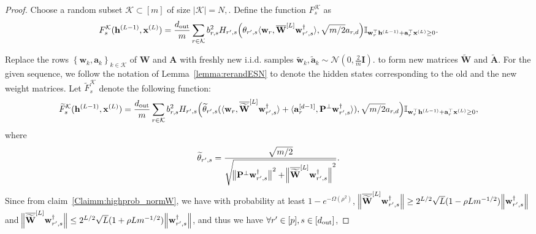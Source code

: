 \begin{claim}
\begin{proof}
				Choose a random subset $\mathcal{K} \subset[m]$ of size $|\mathcal{K}|=N,$. Define the function $F^{\mathcal{K}}_s$ as
				\begin{equation*}
					F_{s}^{\mathcal{K}}(\mathbf{h}^{(L-1)}, \mathbf{x}^{(L)}) = \frac{d_{\mathrm{out}} }{m} \sum_{r \in \mathcal{K}} b_{r, s}^2 H_{r', s}\Big(\theta_{r', s} \langle \mathbf{w}_{r}, \overline{\mathbf{W}}^{[L]} \mathbf{w}_{r', s}^{\dagger}\rangle, \sqrt{m/2} a_{r, d}\Big) \mathbb{I}_{\mathbf{w}_r^{\top} \mathbf{h}^{(L-1)} + \mathbf{a}_r^{\top} \mathbf{x}^{(L)} \ge 0}.  
				\end{equation*}
				
				Replace the rows $\left\{\mathbf{w}_{k}, \mathbf{a}_{k}\right\}_{k \in \mathcal{K}}$ of $\mathbf{W}$ and $\mathbf{A}$ with freshly new i.i.d. samples $\widetilde{\mathbf{w}}_{k}, \widetilde{\mathbf{a}}_{k} \sim \mathcal{N}\left(0, \frac{2}{m} \mathbf{I}\right).$ to form new matrices $\widetilde{\mathbf{W}}$ and $\widetilde{\mathbf{A}}$. For the given sequence, we follow the notation of Lemma~\ref{lemma:rerandESN} to denote the hidden states corresponding to the old and the new weight matrices. Let $\widetilde{F}^{\mathcal{K}}_s$ denote the following function:
				\begin{equation*} \widetilde{F}^{\mathcal{K}}_s(\mathbf{h}^{(L-1)}, \mathbf{x}^{(L)}) = \frac{d_{\mathrm{out}} }{m} \sum_{r \in \mathcal{K}} b_{r, s}^2 H_{r', s}\Big(\widetilde{\theta}_{r', s} (\langle \mathbf{w}_{r}, \overline{\widetilde{\mathbf{W}}}^{[L]} \mathbf{w}_{r', s}^{\dagger}\rangle + \langle \mathbf{a}_{r}^{[d-1]},  \mathbf{P}^{\perp}\mathbf{w}_{r', s}^{\dagger}  \rangle), \sqrt{m/2} a_{r, d}\Big) \mathbb{I}_{\mathbf{w}_r^{\top} \mathbf{h}^{(L-1)} + \mathbf{a}_r^{\top} \mathbf{x}^{(L)} \ge 0},
				\end{equation*}
				where
				\begin{equation*} 
					\widetilde{\theta}_{r', s} = \frac{\sqrt{m/2}}{\sqrt{ \norm[1]{\mathbf{P}^{\perp}\mathbf{w}_{r', s}^{\dagger}}^2 + \norm[2]{\overline{\widetilde{\mathbf{W}}}^{[L]} \mathbf{w}_{r', s}^{\dagger}}^2 }}.
				\end{equation*}
				Since from claim~\ref{Claimm:highprob_normW}, we have with probability at least $1-e^{-\Omega(\rho^2)}$, $\norm[2]{\overline{\widetilde{\mathbf{W}}}^{[L]} \mathbf{w}_{r', s}^{\dagger}} \ge 2^{L/2} \sqrt{L} (1 - \rho L m^{-1/2}) \norm{\mathbf{w}_{r', s}^{\dagger}}$ and $\norm[2]{\overline{\widetilde{\mathbf{W}}}^{[L]} \mathbf{w}_{r', s}^{\dagger}} \le 2^{L/2} \sqrt{L} (1 + \rho L m^{-1/2}) \norm{\mathbf{w}_{r', s}^{\dagger}}$, and thus we have $\forall  r' \in [p], s \in [d_{\mathrm{out}} ]$,

\end{proof}
\end{claim}
